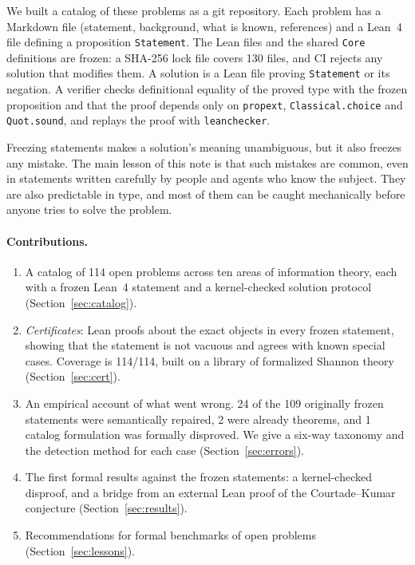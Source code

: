 \documentclass[11pt]{article}
\newcommand{\code}[1]{\texttt{#1}}
\begin{document}
We built a catalog of these problems as a git repository. Each problem has a Markdown file
(statement, background, what is known, references) and a Lean~4 file defining a proposition
\code{Statement}. The Lean files and the shared \code{Core} definitions are frozen: a SHA-256 lock
file covers 130 files, and CI rejects any solution that modifies them. A solution is a Lean file
proving \code{Statement} or its negation. A verifier checks definitional equality of the proved
type with the frozen proposition and that the proof depends only on \code{propext},
\code{Classical.choice} and \code{Quot.sound}, and replays the proof with \code{leanchecker}.

Freezing statements makes a solution's meaning unambiguous, but it also freezes any mistake. The
main lesson of this note is that such mistakes are common, even in statements written carefully
by people and agents who know the subject. They are also predictable in type, and most of them
can be caught mechanically before anyone tries to solve the problem.

\paragraph{Contributions.}
\begin{enumerate}[leftmargin=*,itemsep=2pt]
\item A catalog of 114 open problems across ten areas of information theory, each with a frozen
Lean~4 statement and a kernel-checked solution protocol (Section~\ref{sec:catalog}).
\item \emph{Certificates}: Lean proofs about the exact objects in every frozen statement, showing
that the statement is not vacuous and agrees with known special cases. Coverage is 114/114, built
on a library of formalized Shannon theory (Section~\ref{sec:cert}).
\item An empirical account of what went wrong. 24 of the 109 originally frozen statements were
semantically repaired, 2 were already theorems, and 1 catalog formulation was formally disproved.
We give a six-way taxonomy and the detection method for each case (Section~\ref{sec:errors}).
\item The first formal results against the frozen statements: a kernel-checked disproof, and a
bridge from an external Lean proof of the Courtade--Kumar conjecture (Section~\ref{sec:results}).
\item Recommendations for formal benchmarks of open problems (Section~\ref{sec:lessons}).
\end{enumerate}
\end{document}
